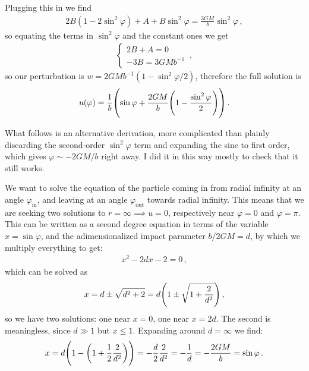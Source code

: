 \documentclass[main.tex]{subfiles}
\begin{document}
Plugging this in we find 
%
\begin{align}
  2 B (1 - 2 \sin^2 \varphi) + A + B \sin^2 \varphi = \frac{3GM}{b} \sin^2 \varphi 
\,,
\end{align}
%
so equating the terms in \(\sin^2\varphi  \) and the constant ones we get 
%
\begin{subequations}
\begin{align}
  \begin{cases}
    2B+A = 0 \\
    -3B = 3GMb^{-1}
  \end{cases}
\,,
\end{align}
\end{subequations}
%
so our perturbation is \(w = 2 GM b^{-1} (1- \sin^2 \varphi / 2)\), therefore the full solution is 
%
\begin{align}
  u(\varphi ) = \frac{1}{b} \qty(\sin \varphi + \frac{2GM}{b} \qty(1 - \frac{\sin^2 \varphi }{2}))
\,.
\end{align}
%

What follows is an alternative derivation, more complicated than plainly discarding the second-order \(\sin^2  \varphi  \) term and expanding the sine to first order, which gives \(\varphi \sim -2GM/b\) right away. I did it in this way mostly to check that it still works. 

We want to solve the equation of the particle coming in from radial infinity at an angle \(\varphi _{\text{in}}\), and leaving at an angle \(\varphi _{\text{out}}\) towards radial infinity. This means that we are seeking two solutions to \(r = \infty \implies u = 0\), respectively near \(\varphi = 0\) and \(\varphi = \pi \). This can be written as a second degree equation in terms of the variable \(x = \sin \varphi \), and the adimensionalized impact parameter \(b/ 2GM = d\), by which we multiply everything to get:  
%
\begin{align}
  x^2 - 2dx - 2 = 0
\,,
\end{align}
%
which can be solved as 
%
\begin{align}
  x =d \pm \sqrt{d^2 + 2}
  = d \qty(1 \pm \sqrt{1 + \frac{2}{d^2}})
\,,
\end{align}
%
so we have two solutions: one near \(x=0\), one near \(x=2d\). The second is meaningless, since \(d \gg 1 \) but \(x \leq 1\). Expanding around \(d = \infty\) we find: 
%
\begin{align}
  x = d \qty(1 - \qty(1 + \frac{1}{2} \frac{2}{d^2})) = -\frac{d}{2}  \frac{2}{d^2} = -\frac{1}{d} = - \frac{2GM}{b} = \sin \varphi 
\,. 
\end{align}
%
\end{document}
